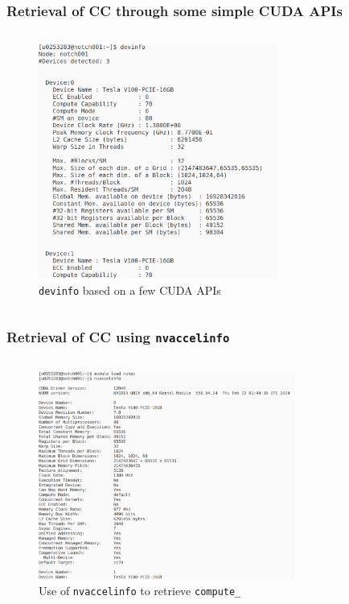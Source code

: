 \begin{frame}
   \frametitle{Retrieval of CC through some simple CUDA APIs}
     \begin{columns}
    \begin{figure}[H]
       \centering
          \includegraphics[width=0.70\textwidth]{./img/devinfo.png}
	    \caption{\small{\texttt{devinfo} based on a few CUDA APIs}}
     \end{figure}
     \end{columns}
\end{frame}


\begin{frame}
	\frametitle{Retrieval of CC using \texttt{nvaccelinfo}}
     \begin{columns}
    \begin{figure}[H]
       \centering
          \includegraphics[width=0.75\textwidth]{./img/nvaccelinfo.png}
	    \caption{\small{Use of \texttt{nvaccelinfo} to retrieve \texttt{compute\_}}}
    \end{figure}
     \end{columns}
\end{frame}


